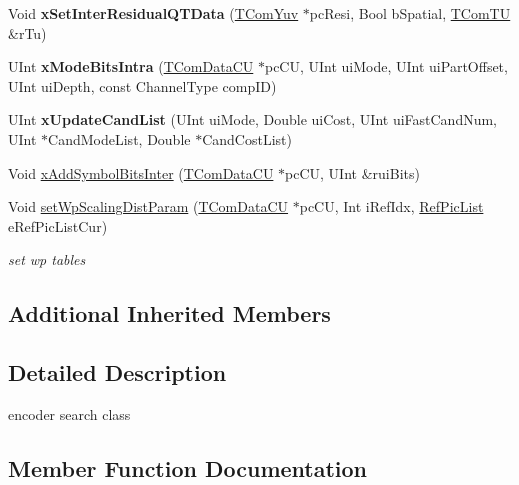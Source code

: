 \begin{DoxyCompactItemize}
\mbox{\label{class_t_enc_search_a84f92105bf0cdba3c4ef9920a8c26f52}} 
Void {\bfseries x\+Set\+Inter\+Residual\+Q\+T\+Data} (\hyperlink{class_t_com_yuv}{T\+Com\+Yuv} $\ast$pc\+Resi, Bool b\+Spatial, \hyperlink{class_t_com_t_u}{T\+Com\+TU} \&r\+Tu)
\item 
\mbox{\label{class_t_enc_search_a658b12c710a325279d9a9011e905d930}} 
U\+Int {\bfseries x\+Mode\+Bits\+Intra} (\hyperlink{class_t_com_data_c_u}{T\+Com\+Data\+CU} $\ast$pc\+CU, U\+Int ui\+Mode, U\+Int ui\+Part\+Offset, U\+Int ui\+Depth, const Channel\+Type comp\+ID)
\item 
\mbox{\label{class_t_enc_search_aa08da60bf76db4fc042cd5190ff24bea}} 
U\+Int {\bfseries x\+Update\+Cand\+List} (U\+Int ui\+Mode, Double ui\+Cost, U\+Int ui\+Fast\+Cand\+Num, U\+Int $\ast$Cand\+Mode\+List, Double $\ast$Cand\+Cost\+List)
\item 
Void \hyperlink{class_t_enc_search_a5756a573787655c2a6d2c4bb7c264366}{x\+Add\+Symbol\+Bits\+Inter} (\hyperlink{class_t_com_data_c_u}{T\+Com\+Data\+CU} $\ast$pc\+CU, U\+Int \&rui\+Bits)
\item 
\mbox{\label{class_t_enc_search_aeb5c18baab21909fa89ab41d1664320c}} 
Void \hyperlink{class_t_enc_search_aeb5c18baab21909fa89ab41d1664320c}{set\+Wp\+Scaling\+Dist\+Param} (\hyperlink{class_t_com_data_c_u}{T\+Com\+Data\+CU} $\ast$pc\+CU, Int i\+Ref\+Idx, \hyperlink{_type_def_8h_a93cea48eb9dcfd661168dee82e41b384}{Ref\+Pic\+List} e\+Ref\+Pic\+List\+Cur)
\begin{DoxyCompactList}\small\item\em set wp tables \end{DoxyCompactList}\end{DoxyCompactItemize}
\subsection*{Additional Inherited Members}


\subsection{Detailed Description}
encoder search class 

\subsection{Member Function Documentation}
\mbox{\label{class_t_enc_search_abf4bab027ce2425740115f3b59fe7a1a}} 
